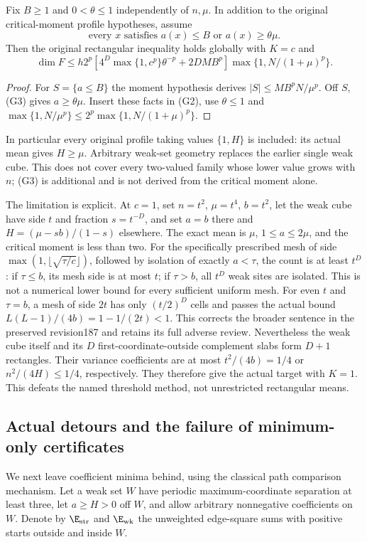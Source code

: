 \begin{theorem}\label{thm:geo-gap}
Fix $B\geq1$ and $0<\theta\leq1$ independently of $n,\mu$. In addition
to the original critical-moment profile hypotheses, assume
\[
 \text{every }x\text{ satisfies }a(x)\leq B\text{ or }a(x)\geq\theta\mu.
                                                                    \tag{G3}
\]
Then the original rectangular inequality holds globally with $K=c$ and
\[
 \dim F\leq h2^p\left[4^D\max\{1,c^p\}\theta^{-p}+2DMB^p\right]
             \max\{1,N/(1+\mu)^p\}.
\]
\end{theorem}
\begin{proof}
For $S=\{a\leq B\}$ the moment hypothesis derives
$|S|\leq MB^pN/\mu^p$. Off $S$, (G3) gives $a\geq\theta\mu$.
Insert these facts in (G2), use $\theta\leq1$ and
$\max\{1,N/\mu^p\}\leq2^p\max\{1,N/(1+\mu)^p\}$.
\end{proof}
In particular every original profile taking values $\{1,H\}$ is included:
its actual mean gives $H\geq\mu$. Arbitrary weak-set geometry replaces the
earlier single weak cube. This does not cover every two-valued family
whose lower value grows with $n$; (G3) is additional and is not derived
from the critical moment alone.

The limitation is explicit. At $c=1$, set $n=t^2$, $\mu=t^4$, $b=t^2$,
let the weak cube have side $t$ and fraction $s=t^{-D}$, and set
$a=b$ there and $H=(\mu-sb)/(1-s)$ elsewhere. The exact mean is $\mu$,
$1\leq a\leq2\mu$, and the critical moment is less than two.
For the specifically prescribed mesh of side
$\max(1,\lfloor\sqrt{\tau/c}\rfloor)$, followed by isolation of exactly
$a<\tau$, the count is at least $t^D$: if $\tau\le b$, its mesh side is
at most $t$; if $\tau>b$, all $t^D$ weak sites are isolated. This is not
a numerical lower bound for every sufficient uniform mesh. For even $t$
and $\tau=b$, a mesh of side $2t$ has only $(t/2)^D$ cells and passes the
actual bound $L(L-1)/(4b)=1-1/(2t)<1$. This corrects the broader sentence
in the preserved revision187 and retains its full adverse review.
Nevertheless the weak cube itself and its $D$ first-coordinate-outside
complement slabs form $D+1$ rectangles. Their variance coefficients are
at most $t^2/(4b)=1/4$ or $n^2/(4H)\leq1/4$, respectively.
They therefore give the actual target with $K=1$. This defeats the named
threshold method, not unrestricted rectangular means.

\subsection{Actual detours and the failure of minimum-only certificates}
We next leave coefficient minima behind, using the classical path
comparison mechanism\cite{geo:comparison}. Let a weak set $W$ have periodic
maximum-coordinate separation at least three, let $a\geq H>0$ off $W$,
and allow arbitrary nonnegative coefficients on $W$. Denote by
$\E_{\rm str}$ and $\E_{\rm wk}$ the unweighted edge-square sums with
positive starts outside and inside $W$.

